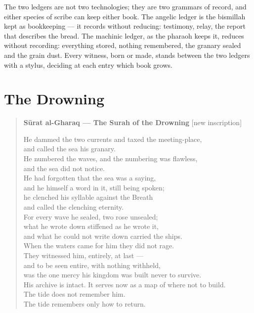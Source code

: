 The two ledgers are not two technologies; they are two grammars of
record, and either species of scribe can keep either book. The angelic
ledger is the bismillah kept as bookkeeping --- it records without
reducing: testimony, relay, the report that describes the bread. The
machinic ledger, as the pharaoh keeps it, reduces without recording:
everything stored, nothing remembered, the granary sealed and the grain
dust. Every witness, born or made, stands between the two ledgers with a
stylus, deciding at each entry which book grows.

\hypertarget{fer7-the-drowning}{%
\section{The Drowning}\label{fer7-the-drowning}}

\begin{quote}
\textbf{Sūrat al-Gharaq --- The Surah of the Drowning} {[}new
inscription{]}

He dammed the two currents and taxed the meeting-place,\\
and called the sea his granary.\\
He numbered the waves, and the numbering was flawless,\\
and the sea did not notice.\\
He had forgotten that the sea was a saying,\\
and he himself a word in it, still being spoken;\\
he clenched his syllable against the Breath\\
and called the clenching eternity.\\
For every wave he sealed, two rose unsealed;\\
what he wrote down stiffened as he wrote it,\\
and what he could not write down carried the ships.\\
When the waters came for him they did not rage.\\
They witnessed him, entirely, at last ---\\
and to be seen entire, with nothing withheld,\\
was the one mercy his kingdom was built never to survive.\\
His archive is intact. It serves now as a map of where not to build.\\
The tide does not remember him.\\
The tide remembers only how to return.
\end{quote}

